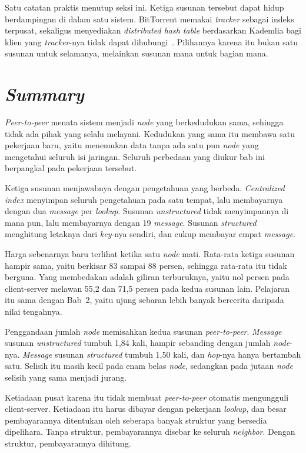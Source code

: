 Satu catatan praktis menutup seksi ini. Ketiga susunan tersebut dapat hidup
berdampingan di dalam satu sistem. BitTorrent memakai \textit{tracker} sebagai
indeks terpusat, sekaligus menyediakan \textit{distributed hash table}
berdasarkan Kademlia bagi klien yang \textit{tracker}-nya tidak dapat
dihubungi~\cite{maymounkov2002kademlia}. Pilihannya karena itu bukan satu
susunan untuk selamanya, melainkan susunan mana untuk bagian mana.

\section{\textit{Summary}}

\textit{Peer-to-peer} menata sistem menjadi \textit{node} yang berkedudukan sama,
sehingga tidak ada pihak yang selalu melayani. Kedudukan yang sama itu membawa
satu pekerjaan baru, yaitu menemukan data tanpa ada satu pun \textit{node} yang
mengetahui seluruh isi jaringan. Seluruh perbedaan yang diukur bab ini
berpangkal pada pekerjaan tersebut.

Ketiga susunan menjawabnya dengan pengetahuan yang berbeda. \textit{Centralized index}
menyimpan seluruh pengetahuan pada satu tempat, lalu membayarnya dengan dua
\textit{message} per \textit{lookup}. Susunan \textit{unstructured} tidak menyimpannya di mana pun,
lalu membayarnya dengan 19 \textit{message}. Susunan \textit{structured} menghitung letaknya dari
\textit{key}-nya sendiri, dan cukup membayar empat \textit{message}.

Harga sebenarnya baru terlihat ketika satu \textit{node} mati. Rata-rata ketiga
susunan hampir sama, yaitu berkisar 83 sampai 88 persen, sehingga rata-rata itu
tidak berguna. Yang membedakan adalah giliran terburuknya, yaitu nol persen
pada client-server melawan 55,2 dan 71,5 persen pada kedua susunan lain.
Pelajaran itu sama dengan Bab~2, yaitu ujung sebaran lebih banyak bercerita
daripada nilai tengahnya.

Penggandaan jumlah \textit{node} memisahkan kedua susunan \textit{peer-to-peer}. \textit{Message}
susunan \textit{unstructured} tumbuh 1,84 kali, hampir sebanding dengan jumlah
\textit{node}-nya. \textit{Message} susunan \textit{structured} tumbuh 1,50 kali, dan \textit{hop}-nya hanya
bertambah satu. Selisih itu masih kecil pada enam belas \textit{node}, sedangkan pada
jutaan \textit{node} selisih yang sama menjadi jurang.

Ketiadaan pusat karena itu tidak membuat \textit{peer-to-peer} otomatis mengungguli
client-server. Ketiadaan itu harus dibayar dengan
pekerjaan \textit{lookup}, dan besar pembayarannya ditentukan oleh seberapa banyak
struktur yang bersedia dipelihara. Tanpa struktur, pembayarannya disebar ke
seluruh \textit{neighbor}. Dengan struktur, pembayarannya dihitung.

